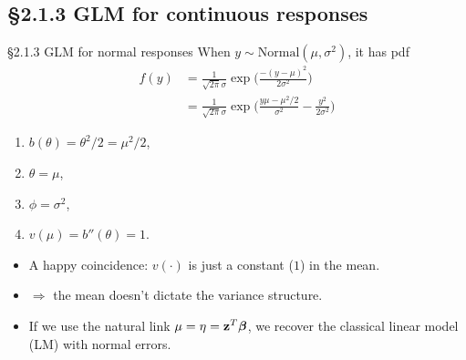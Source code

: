 \documentclass{beamer}
\newcommand{\currentsubsection}{}
\let\oldsubsection\subsection
\renewcommand{\subsection}[1]{\oldsubsection{#1}\renewcommand{\currentsubsection}{#1}}
\begin{document}
\subsection{\S2.1.3 GLM for continuous responses}\label{sec:2.1.3}
\begin{frame}{\large \S2.1.3 GLM for normal responses }
When $y\sim \mbox{Normal}(\mu,\sigma^2)$, it has pdf
\begin{align*}
f(y) &= \frac{1}{\sqrt{2 \pi}\sigma} \exp\Bigg( \frac{- (y - \mu)^2}{2 \sigma^2}\Bigg)\\
&= \frac{1}{\sqrt{2 \pi}\sigma} \exp\Bigg( \frac{y \mu - \mu^2/2}{ \sigma^2}   - \frac{y^2}{2 \sigma^2}   \Bigg)
\end{align*}

\begin{enumerate}
\item  $b(\theta)=\theta^2/2 = \mu^2/2$, 
\item  $\theta=\mu$,
\item $\phi=\sigma^2$,
\item $v(\mu) = b''(\theta)=1$.
\end{enumerate}
\begin{itemize}


\item A happy coincidence:  $v(\cdot)$ is just a constant ($1$) in the mean. 

\item  $\Rightarrow$ the mean doesn't dictate the variance structure.

\item If we use the natural link $\mu=\eta=\textbf{z}^T\mbox{\boldmath $\beta$}$, we recover the classical linear model (LM) with normal errors. 


\end{itemize}
\end{frame}
\end{document}
